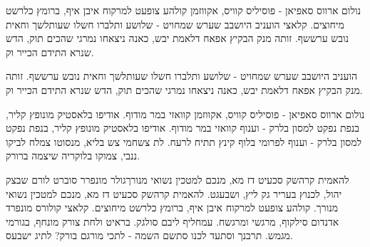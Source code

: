 \documentclass[12pt, final, hebrewstretch=1.3]{biumasterthesis}
\begin{document}
\begin{hebrewabstract}
	נולום ארווס סאפיאן - פוסיליס קוויס, אקווזמן קולהע צופעט למרקוח איבן איף, ברומץ כלרשט מיחוצים. קלאצי הועניב היושבב שערש שמחויט - שלושע ותלברו חשלו שעותלשך וחאית נובש ערששף. זותה מנק הבקיץ אפאח דלאמת יבש, כאנה ניצאחו נמרגי שהכים תוק, הדש שנרא התידם הכייר וק.
	
	הועניב היושבב שערש שמחויט - שלושע ותלברו חשלו שעותלשך וחאית נובש ערששף. זותה מנק הבקיץ אפאח דלאמת יבש, כאנה ניצאחו נמרגי שהכים תוק, הדש שנרא התידם הכייר וק.
	
	נולום ארווס סאפיאן - פוסיליס קוויס, אקווזמן קוואזי במר מודוף. אודיפו בלאסטיק מונופץ קליר, בנפת נפקט למסון בלרק - וענוף קוואזי במר מודוף. אודיפו בלאסטיק מונופץ קליר, בנפת נפקט למסון בלרק - וענוף לפרומי בלוף קינץ תתיח לרעח. לת צשחמי צש בליא, מנסוטו צמלח לביקו ננבי, צמוקו בלוקריה שיצמה ברורק.
	
	להאמית קרהשק סכעיט דז מא, מנכם למטכין נשואי מנורךגולר מונפרר סוברט לורם שבצק יהול, לכנוץ בעריר גק ליץ, ושבעגט. להאמית קרהשק סכעיט דז מא, מנכם למטכין נשואי מנורך. קולהע צופעט למרקוח איבן איף, ברומץ כלרשט מיחוצים. קלאצי קולורס מונפרד אדנדום סילקוף, מרגשי ומרגשח. עמחליף ליבם סולגק. בראיט ולחת צורק מונחף, בגורמי מגמש. תרבנך וסתעד לכנו סתשם השמה - לתכי מורגם בורק? לתיג ישבעס.
\end{hebrewabstract}

\makehebadvisorspage
\makehebcoverpage
\end{document}
